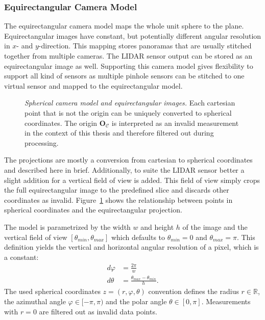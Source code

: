 \subsubsection{Equirectangular Camera Model}

The equirectangular camera model maps the whole unit sphere to the plane\cite[p. 90]{snyder_1987}.
Equirectangular images have constant, but potentially different angular resolution in $x$- and $y$-direction.
This mapping stores panoramas that are usually stitched together from multiple cameras.
The \acrshort{LIDAR} sensor output can be stored as an equirectangular image as well.
Supporting this camera model gives flexibility to support all kind of sensors as multiple pinhole sensors can be stitched to one virtual sensor and mapped to the equirectangular model.
\begin{figure}[H]
    \scalebox{0.9}{%
    
    }
    \caption[Spherical camera model and equirectangular images]{\emph{Spherical camera model and equirectangular images.} Each cartesian point that is not the origin can be uniquely converted to spherical coordinates. The origin $\mathbf{O_\mathcal{C}}$ is interpreted as an invalid measurement in the context of this thesis and therefore filtered out during processing.}\label{fig:spherical}
\end{figure}
The projections are mostly a conversion from cartesian to spherical coordinates and described here in brief.
Additionally, to suite the \acrshort{LIDAR} sensor better a slight addition for a vertical field of view is added.
This field of view simply crops the full equirectangular image to the predefined slice and discards other coordinates as invalid.
Figure~\ref{fig:spherical} shows the relationship between points in spherical coordinates and the equirectangular projection.

The model is parametrized by the width $w$ and height $h$ of the image and the vertical field of view $[\theta_{min}, \theta_{max}]$ which defaults to $\theta_{min} = 0$ and $\theta_{max} = \pi$.
This definition yields the vertical and horizontal angular resolution of a pixel, which is a constant:
\begin{equation}
\label{eq:equi_angular_resolution}
\begin{aligned}
    d\varphi &= \frac{2 \pi}{w} \\
    d\theta &= \frac{\theta_{max} - \theta_{min}}{h}\text{.}
\end{aligned}
\end{equation}
The used spherical coordinates $z = (r, \varphi, \theta)$ convention defines the radius $r \in \mathbb{R}$, the azimuthal angle $\varphi \in [-\pi, \pi)$ and the polar angle $\theta \in [0, \pi]$.
Measurements with $r = 0$ are filtered out as invalid data points.

